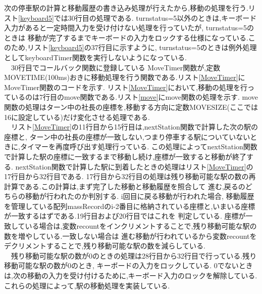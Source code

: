 \documentclass[a4j]{jarticle}
\begin{document}
    次の停車駅の計算と移動履歴の書き込み処理が行えたから,移動の処理を行う.リスト\ref{keyboard5}では30行目の処理である.
    turnstatus=5以外のときは,キーボード入力があると一定時間入力を受け付けない処理を行っていたが, turnstatus=5のときは
    移動が完了するまでキーボードの入力をロックする仕様になっている.このため,リスト\ref{keyboard5}の37行目に示すように,
    turnstatus=5のときは例外処理としてkeyboardTimer関数を実行しないようになっている. \\
    　30行目でコールバック関数に登録している
    MoveTimer関数が,定数MOVETIME(100ms)おきに移動処理を行う関数である.リスト\ref{MoveTimer}にMoveTimer関数のコードを示す.
    リスト\ref{MoveTimer}において,移動の処理を行っているのは7行目のmove関数である.リスト\ref{move}にmove関数の処理を示す.
    move関数の処理はターン中の社長の座標を,移動する方向に定数MOVESIZE(ここでは16に設定している)だけ変化させる処理である.\\
    　リスト\ref{MoveTimer}の11行目から15行目は,nextStation関数で計算した次の駅の座標と,
    ターン中の社長の座標が一致しない,つまり停車する駅についていないときに,タイマーを再度呼び出す処理行っている.
    この処理によってnextStation関数で計算した駅の座標に一致するまで移動し続け,座標が一致すると移動が終了する.
    nextStation関数で計算した駅に到着したときの処理はリスト\ref{MoveTimer}の17行目から32行目である.
    17行目から32行目の処理は残り移動可能な駅の数の再計算である.この計算は,まず完了した移動と移動履歴を照合して
    進む,戻るのどちらの移動が行われたのか判別する. i回目に戻る移動が行われた場合,
    移動履歴を管理している配列massRecordのi-2番目に格納されている座標と,いまいる座標が一致するはずである.19行目および20行目ではこれを
    判定している. 座標が一致している場合は,変数recountをインクリメントすることで,残り移動可能な駅の数を増やしている.一致しない場合は
    進む移動が行われているから変数recountをデクリメントすることで,残り移動可能な駅の数を減らしている.\\
    　残り移動可能な駅の数が0のときの処理は28行目から32行目で行っている.残り移動可能な駅の数が0のとき,
    キーボードの入力をロックしている. 0でないときは,次の移動の入力を受け付けるために,キーボード入力のロックを解除している.
    これらの処理によって,駅の移動処理を実装している.
\end{document}
